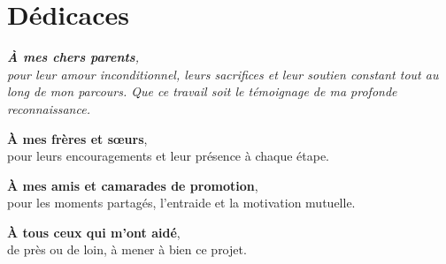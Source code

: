 \chapter*{Dédicaces}
\vspace*{1cm}
\begin{center}
\begin{minipage}{0.82\linewidth}
\centering\itshape\large
\textbf{À mes chers parents},\\
pour leur amour inconditionnel, leurs sacrifices et leur soutien constant tout au long de mon parcours. Que ce travail soit le témoignage de ma profonde reconnaissance.

\vspace{1cm}
\textbf{À mes frères et sœurs},\\
pour leurs encouragements et leur présence à chaque étape.

\vspace{1cm}
\textbf{À mes amis et camarades de promotion},\\
pour les moments partagés, l'entraide et la motivation mutuelle.

\vspace{1cm}
\textbf{À tous ceux qui m'ont aidé},\\
de près ou de loin, à mener à bien ce projet.

\vspace{1.5cm}
\upshape\hfill \etudiant
\end{minipage}
\end{center}
